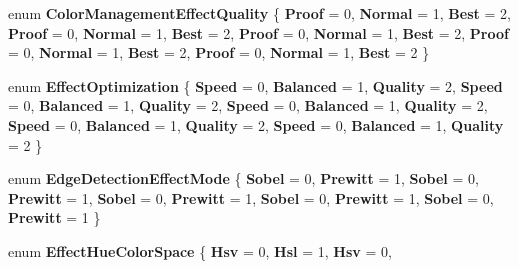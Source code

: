 \begin{DoxyCompactItemize}
enum {\bfseries Color\+Management\+Effect\+Quality} \{ \newline
{\bfseries Proof} = 0, 
{\bfseries Normal} = 1, 
{\bfseries Best} = 2, 
{\bfseries Proof} = 0, 
\newline
{\bfseries Normal} = 1, 
{\bfseries Best} = 2, 
{\bfseries Proof} = 0, 
{\bfseries Normal} = 1, 
\newline
{\bfseries Best} = 2, 
{\bfseries Proof} = 0, 
{\bfseries Normal} = 1, 
{\bfseries Best} = 2, 
\newline
{\bfseries Proof} = 0, 
{\bfseries Normal} = 1, 
{\bfseries Best} = 2
 \}
\item 
\mbox{\label{namespace_microsoft_1_1_graphics_1_1_canvas_1_1_effects_abe4426b8577454af68a566839afdea96}} 
enum {\bfseries Effect\+Optimization} \{ \newline
{\bfseries Speed} = 0, 
{\bfseries Balanced} = 1, 
{\bfseries Quality} = 2, 
{\bfseries Speed} = 0, 
\newline
{\bfseries Balanced} = 1, 
{\bfseries Quality} = 2, 
{\bfseries Speed} = 0, 
{\bfseries Balanced} = 1, 
\newline
{\bfseries Quality} = 2, 
{\bfseries Speed} = 0, 
{\bfseries Balanced} = 1, 
{\bfseries Quality} = 2, 
\newline
{\bfseries Speed} = 0, 
{\bfseries Balanced} = 1, 
{\bfseries Quality} = 2
 \}
\item 
\mbox{\label{namespace_microsoft_1_1_graphics_1_1_canvas_1_1_effects_a587bd4a5e7bae1bcbe7620bbf9ac0959}} 
enum {\bfseries Edge\+Detection\+Effect\+Mode} \{ \newline
{\bfseries Sobel} = 0, 
{\bfseries Prewitt} = 1, 
{\bfseries Sobel} = 0, 
{\bfseries Prewitt} = 1, 
\newline
{\bfseries Sobel} = 0, 
{\bfseries Prewitt} = 1, 
{\bfseries Sobel} = 0, 
{\bfseries Prewitt} = 1, 
\newline
{\bfseries Sobel} = 0, 
{\bfseries Prewitt} = 1
 \}
\item 
\mbox{\label{namespace_microsoft_1_1_graphics_1_1_canvas_1_1_effects_ae7299c185ad53a8bf344202e319bf35a}} 
enum {\bfseries Effect\+Hue\+Color\+Space} \{ \newline
{\bfseries Hsv} = 0, 
{\bfseries Hsl} = 1, 
{\bfseries Hsv} = 0, 

\end{DoxyCompactItemize}
